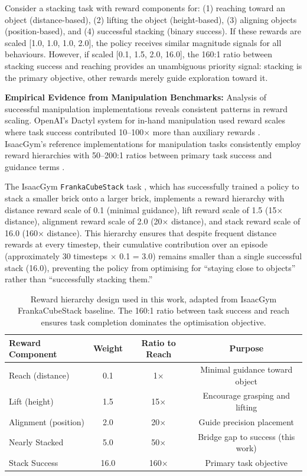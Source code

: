 \documentclass[12pt,a4paper,oneside]{report}
\begin{document}
Consider a stacking task with reward components for: (1) reaching toward an object (distance-based), (2) lifting the object (height-based), (3) aligning objects (position-based), and (4) successful stacking (binary success). If these rewards are scaled [1.0, 1.0, 1.0, 2.0], the policy receives similar magnitude signals for all behaviours. However, if scaled [0.1, 1.5, 2.0, 16.0], the 160:1 ratio between stacking success and reaching provides an unambiguous priority signal: stacking is the primary objective, other rewards merely guide exploration toward it.


\textbf{Empirical Evidence from Manipulation Benchmarks:}
Analysis of successful manipulation implementations reveals consistent patterns in reward scaling. OpenAI's Dactyl system for in-hand manipulation used reward scales where task success contributed 10--100$\times$ more than auxiliary rewards \cite{openaiLearningDexterousInHand2019b}. IsaacGym's reference implementations for manipulation tasks consistently employ reward hierarchies with 50--200:1 ratios between primary task success and guidance terms \cite{makoviychukIsaacGymHigh2021b}.

The IsaacGym \texttt{FrankaCubeStack} task \cite{makoviychukIsaacGymHigh2021b}, which has successfully trained a policy to stack a smaller brick onto a larger brick, implements a reward hierarchy with distance reward scale of 0.1 (minimal guidance), lift reward scale of 1.5 (15$\times$ distance), alignment reward scale of 2.0 (20$\times$ distance), and stack reward scale of 16.0 (160$\times$ distance). This hierarchy ensures that despite frequent distance rewards at every timestep, their cumulative contribution over an episode (approximately 30 timesteps $\times$ 0.1 = 3.0) remains smaller than a single successful stack (16.0), preventing the policy from optimising for ``staying close to objects'' rather than ``successfully stacking them.''

\begin{table}[h]
\centering
\begin{tabular}{|l|c|c|c|}
\hline
\textbf{Reward Component} & \textbf{Weight} & \textbf{Ratio to Reach} & \textbf{Purpose} \\
\hline
Reach (distance) & 0.1 & 1$\times$ & Minimal guidance toward object \\
Lift (height) & 1.5 & 15$\times$ & Encourage grasping and lifting \\
Alignment (position) & 2.0 & 20$\times$ & Guide precision placement \\
Nearly Stacked & 5.0 & 50$\times$ & Bridge gap to success (this work) \\
Stack Success & 16.0 & 160$\times$ & Primary task objective \\
\hline
\end{tabular}
\caption{Reward hierarchy design used in this work, adapted from IsaacGym FrankaCubeStack baseline. The 160:1 ratio between task success and reach ensures task completion dominates the optimisation objective.}
\label{tab:reward_hierarchy}
\end{table}
\end{document}
